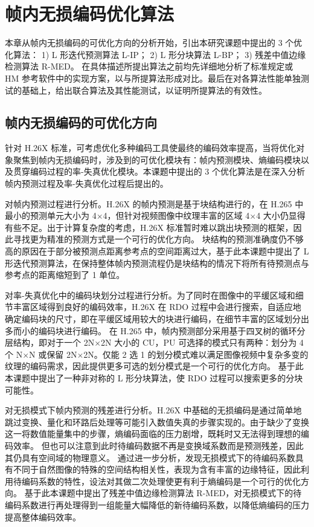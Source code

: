 \chapter{帧内无损编码优化算法}
\label{cha:c3}
本章从帧内无损编码的可优化方向的分析开始，引出本研究课题中提出的 3 个优化算法：
1) L 形迭代预测算法 L-IP；
2) L 形分块算法 L-BP；
3) 残差中值边缘检测算法 R-MED。
在具体描述所提出算法之前均先详细地分析了标准规定或 HM 参考软件中的实现方案，以与所提算法形成对比。最后在对各算法性能单独测试的基础上，给出联合算法及其性能测试，以证明所提算法的有效性。

\section{帧内无损编码的可优化方向}
针对 H.26X 标准，可考虑优化多种编码工具使最终的编码效率提高，当将优化对象聚焦到帧内无损编码时，涉及到的可优化模块有：帧内预测模块、熵编码模块以及贯穿编码过程的率-失真优化模块。本课题中提出的 3 个优化算法是在深入分析帧内预测过程及率-失真优化过程后提出的。

对帧内预测过程进行分析。H.26X 的帧内预测是基于块结构进行的，在 H.265 中最小的预测单元大小为 4$\times$4，但针对视频图像中纹理丰富的区域 4$\times$4 大小仍显得有些不足。出于计算复杂度的考虑，H.26X 标准暂时难以跳出块预测的框架，因此寻找更为精准的预测方式是一个可行的优化方向。
块结构的预测准确度仍不够高的原因在于部分被预测点距离参考点的空间距离过大，基于此本课题中提出了 L 形迭代预测算法，在保持整体帧内预测流程仍是块结构的情况下将所有待预测点与参考点的距离缩短到了 1 单位。

对率-失真优化中的编码块划分过程进行分析。为了同时在图像中的平缓区域和细节丰富区域得到良好的编码效率，H.26X 在 RDO 过程中会进行搜索，自适应地确定编码块的尺寸，即在平缓区域用较大的块进行编码，在细节丰富的区域划分出多而小的编码块进行编码。
在 H.265 中，帧内预测部分采用基于四叉树的循环分层结构，即对于一个 2N$\times$2N 大小的 CU，PU 可选择的模式只有两种：划分为 4 个 N$\times$N 或保留 2N$\times$2N。仅能 2 选 1 的划分模式难以满足图像视频中复杂多变的纹理的编码需求，因此提供更多可选的划分模式是一个可行的优化方向。
基于此本课题中提出了一种非对称的 L 形分块算法，使 RDO 过程可以搜索更多的分块可能性。

对无损模式下帧内预测的残差进行分析。H.26X 中基础的无损编码是通过简单地跳过变换、量化和环路后处理等可能引入数值失真的步骤实现的。由于缺少了变换这一将数值能量集中的步骤，熵编码面临的压力剧增，既耗时又无法得到理想的编码效率。
但也可以注意到此时待编码数据不再是变换域系数而是预测残差，因此其仍具有空间域的物理意义。
通过进一步分析，发现无损模式下的待编码系数具有不同于自然图像的特殊的空间结构相关性，表现为含有丰富的边缘特征，因此利用待编码系数的特性，设法对其做二次处理使更有利于熵编码是一个可行的优化方向。
基于此本课题中提出了残差中值边缘检测算法 R-MED，对无损模式下的待编码系数进行再处理得到一组能量大幅降低的新待编码系数，以降低熵编码的压力提高整体编码效率。

